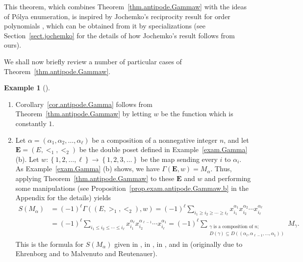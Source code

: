 \documentclass[numbers=enddot,12pt,final,onecolumn,notitlepage,abstracton]{scrartcl}
\theoremstyle{definition}
\newtheorem{exam}[theo]{Example}
\newenvironment{example}[1][]
{\begin{exam}[#1]\begin{leftbar}}
{\end{leftbar}\end{exam}}
\let\sumnonlimits\sum
\renewcommand{\sum}{\sumnonlimits\limits}
\newenvironment{verlong}{}{}
\newcommand{\EE}{{\mathbf{E}}}
\begin{document}
This theorem, which combines Theorem~\ref{thm.antipode.Gammaw} with the
ideas of P\'olya enumeration, is inspired by Jochemko's reciprocity
result for order polynomials \cite[Theorem 2.8]{Joch}, which can be
obtained from it by specializations (see Section~\ref{sect.jochemko}
for the details of how Jochemko's result follows from ours).

We shall now briefly review a number of particular cases of
Theorem~\ref{thm.antipode.Gammaw}.

\begin{example}
\label{exam.antipode.Gammaw}

\begin{enumerate}

\item[(a)] Corollary~\ref{cor.antipode.Gamma}
follows from Theorem~\ref{thm.antipode.Gammaw} by letting $w$
be the function which is constantly $1$.

\item[(b)] Let
$\alpha = \left(\alpha_1, \alpha_2, \ldots, \alpha_\ell\right)$
be a composition of a nonnegative integer $n$, and let
$\EE = \left(E, <_1, <_2\right)$ be the double poset defined
in Example~\ref{exam.Gamma} (b). Let
$w : \left\{1, 2, \ldots, \ell\right\} \to \left\{ 1, 2, 3,
\ldots \right\}$ be the map sending every $i$ to $\alpha_i$.
As Example~\ref{exam.Gamma} (b) shows, we have
$\Gamma\left(\EE, w\right) = M_\alpha$.
Thus, applying Theorem~\ref{thm.antipode.Gammaw} to these $\EE$
and $w$
\begin{verlong}
and performing some manipulations
(see Proposition~\ref{prop.exam.antipode.Gammaw.b} in the
Appendix for the details)
\end{verlong}
yields
\begin{align*}
S\left(M_\alpha\right)
&= \left(-1\right)^\ell
   \Gamma\left(\left(E, >_1, <_2\right), w\right)
= \left(-1\right)^\ell
  \sum_{i_1 \geq i_2 \geq \cdots \geq i_\ell}
  x_{i_1}^{\alpha_1} x_{i_2}^{\alpha_2} \cdots
      x_{i_\ell}^{\alpha_\ell} \\
&= \left(-1\right)^\ell
  \sum_{i_1 \leq i_2 \leq \cdots \leq i_\ell}
  x_{i_1}^{\alpha_\ell} x_{i_2}^{\alpha_{\ell-1}} \cdots
      x_{i_\ell}^{\alpha_1}
= \left(-1\right)^\ell
  \sum_{\substack{\gamma \text{ is a composition of } n ; \\
        D\left(\gamma\right) \subseteq
        D\left(\left(\alpha_\ell, \alpha_{\ell-1},
                     \ldots, \alpha_1\right)\right)}}
  M_\gamma .
\end{align*}
This is the formula for $S\left(M_\alpha\right)$
given in \cite[Proposition 3.4]{Ehrenb96},
in \cite[(4.26)]{Malve-Thesis}, in
\cite[Theorem 5.1.11]{Reiner}, and in
\cite[Theorem 4.1]{BenSag} (originally due to Ehrenborg
and to Malvenuto and Reutenauer).


\end{enumerate}
\end{example}
\end{document}
